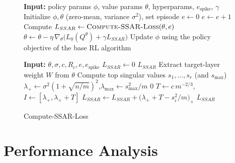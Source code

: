 \begin{figure}[ht]  %
  \begin{minipage}[t]{0.43\textwidth}
    \begin{algorithm}[H]
    \caption{SSAR (high-level)}
    \label{alg:ssar_main}
    \begin{algorithmic}[1]
    \State \textbf{Input:} policy params $\phi$, value params $\theta$, hyperparams, $e_{\mathrm{spike}}$, $\gamma$
    \State Initialize $\phi,\theta$ (zero-mean, variance $\sigma^2$), set episode $e\leftarrow 0$
    \Repeat
      \State $e\leftarrow e+1$
      \State Compute $L_{SSAR}\leftarrow\textsc{Compute-SSAR-Loss}(\theta,e)$
      \State $\theta \leftarrow \theta - \eta\,\nabla_\theta\big(L_0(Q^\theta)+\gamma L_{SSAR}\big)$
      \State Update $\phi$ using the policy objective of the base RL algorithm
    \end{algorithmic}
    \end{algorithm}
  \end{minipage}
  \hfill
  \begin{minipage}[t]{0.55\textwidth}
    \begin{algorithm}[H]
    \caption{Compute-SSAR-Loss}
    \label{alg:ssar_loss}
    \begin{algorithmic}[1]
    \State \textbf{Input:} $\theta,\sigma,c,R_c,e,e_{\mathrm{spike}}$
    \State $L_{SSAR}\leftarrow 0$
     \State \Return $L_{SSAR}$ \EndIf
    \State Extract target-layer weight $W$ from $\theta$
    \State Compute top singular values $s_1,\dots,s_r$ (and $s_{\max}$)
    \State $\lambda_+\leftarrow \sigma^2(1+\sqrt{n/m})^2$,\quad $\lambda_{\max}\leftarrow s_{\max}^2/m$
     \State \Return $0$ 
    \EndIf
    \State $T\leftarrow c\, m^{-2/3}$,\quad $I\leftarrow [\lambda_+,\lambda_+ + T]$
        \State $L_{SSAR}\leftarrow L_{SSAR} + \big(\lambda_+ +T - s_i^2/m\big)_+$
      \EndIf
    \EndFor
    \State \Return $L_{SSAR}$
    \end{algorithmic}
    \end{algorithm}
  \end{minipage}
\end{figure}

\section{Performance Analysis}
\label{sec:analysis}

